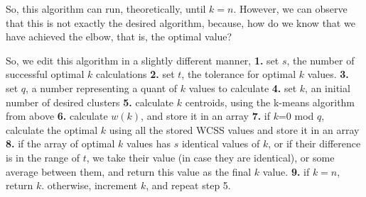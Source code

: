 \documentclass[12pt]{article}
\begin{document}
So, this algorithm can run, theoretically, until \( k=n \). \newline
However, we can observe that this is not exactly the desired algorithm, because, \newline
how do we know that we have achieved the elbow, that is, the optimal value? \newline

So, we edit this algorithm in a slightly different manner,\newline
\textbf{1.} set $s$, the number of successful optimal $k$ calculations \newline
\textbf{2.} set $t$, the tolerance for optimal $k$ values. \newline
\textbf{3.} set $q$, a number representing a quant of $k$ values to calculate \newline
\textbf{4.} set $k$, an initial number of desired clusters \newline
\textbf{5.} calculate $k$ centroids, using the k-means algorithm from above \newline
\textbf{6.} calculate $w(k)$, and store it in an array \newline
\textbf{7.} if $k$=0 mod $q$, calculate the optimal $k$ using all the stored WCSS values and store it in an array \newline
\textbf{8.} if the array of optimal $k$ values has $s$ identical values of $k$, or if their difference is in the range of $t$, we take their value (in case they are identical), or some average between them, and return this value as the final $k$ value. \newline
\textbf{9.} if $k=n$, return $k$. otherwise, increment $k$, and repeat step 5. \newline
\end{document}
